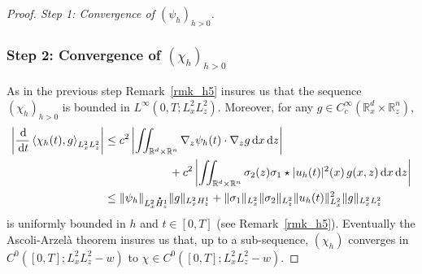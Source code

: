 \documentclass[10pt]{amsart}
\theoremstyle{definition}
\newcommand*{\overbigdot}[1]{%
\accentset{\mbox{\large\bfseries .}}{#1}}
\newcommand{\R}{\mathbb{R}}
\newcommand{\ud}{\, {\mathrm{d}}}
\begin{document}
\begin{proof}[Proof. Step 1: Convergence of $(\psi_{h})_{h>0}$]
\subsubsection*{Step 2: Convergence of $(\chi_{h})_{h>0}$} As in the previous step Remark~\ref{rmk_h5} insures us that the sequence $(\chi_{h})_{h>0}$ is bounded in $L^{\infty}(0,T;L_{x}^{2}L_{z}^{2})$. Moreover, for any $g\in C_{c}^{\infty}(\R_{x}^{d}\times\R_{z}^{n})$,
\begin{align*}
\left|\frac{\ud}{\ud t}\left\langle\chi_{h}(t),g\right\rangle_{L_{x}^{2}L_{z}^{2}}\right|
&\leq c^{2}\left|\iint_{\R^{d}\times\R^{n}}\nabla_{z}\psi_{h}(t)\cdot\nabla_{z}g\ud x\ud z\right|\\
&\hspace*{2cm}+c^{2}\left|\iint_{\R^{d}\times\R^{n}}\sigma_{2}(z)\sigma_{1}\star|u_{h}(t)|^{2}(x)\,g(x,z)\ud x\ud z\right|\\
&\leq\|\psi_{h}\|_{L_{x}^{2}\overbigdot{H}_{z}^{1}}\|g\|_{L_{x}^{2}H_{z}^{1}}+\|\sigma_{1}\|_{L_{x}^{2}}\|\sigma_{2}\|_{L_{z}^{2}}\|u_{h}(t)\|_{L_{x}^{2}}^{2}\|g\|_{L_{x}^{2}L_{z}^{2}}
\end{align*}
is uniformly bounded in $h$ and $t\in[0,T]$ (see Remark~\ref{rmk_h5}). Eventually the Ascoli-Arzelà theorem insures us that, up to a sub-sequence, $(\chi_{h})$ converges in $C^{0}([0,T];L_{x}^{2}L_{z}^{2}-w)$ to $\chi\in C^{0}([0,T];L_{x}^{2}L_{z}^{2}-w)$.


\end{proof}
\end{document}
